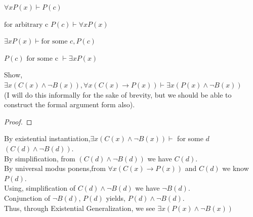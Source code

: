 \vspace{4cm}
\newpage 
\begin{defn}
$\forall x P(x) \vdash P(c)$
\end{defn}
\begin{defn}
$\text{for arbitrary c } P(c)  \vdash \forall x P(x) $
\end{defn}
\begin{defn}
$\exists x P(x) \vdash \text{for some } c, P(c)$
\end{defn}
\begin{defn}
$ P(c) \text{ for some c } \vdash \exists x P(x)$
\end{defn}
\begin{exmp}
Show,
$\exists x(C(x)\land \lnot B(x)), \forall x(C(x) \to P(x)) \vdash \exists x(P(x)\land \lnot B(x))$
\\
(I will do this informally for the sake of brevity, but we should be able to construct the formal argument form also).
\begin{proof}

\end{proof}
By existential instantiation,$\exists x(C(x)\land \lnot B(x))\vdash$ for some $d$ $(C(d)\land \lnot B(d))$. \\
By simplification, from $(C(d)\land \lnot B(d))$ we have $ C(d)$.\\
By universal modus ponens,from 
$\forall x(C(x) \to P(x))$ and $C(d)$ we know $P(d)$.\\
Using, simplification of $C(d)\land \lnot B(d)$ we have  $\lnot B(d)$. 
\\
Conjunction of $\lnot B(d)$, $P(d)$ yields, $P(d) \land \lnot B(d)$.
\\ Thus, through Existential Generalization, we see $\exists x(P(x)\land \lnot B(x))$





\end{exmp}


